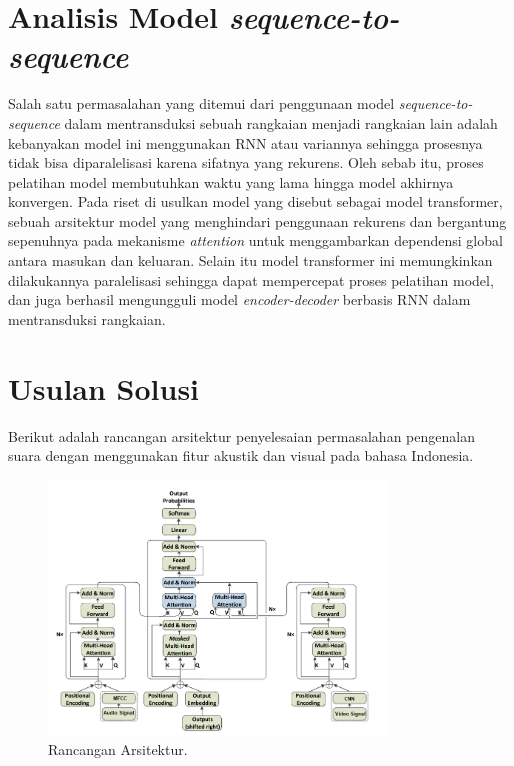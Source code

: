 \section{Analisis Model \textit{sequence-to-sequence}}

Salah satu permasalahan yang ditemui dari penggunaan model \textit{sequence-to-sequence} dalam mentransduksi sebuah rangkaian menjadi rangkaian lain adalah kebanyakan model ini menggunakan RNN atau variannya sehingga prosesnya tidak bisa diparalelisasi karena sifatnya yang rekurens. Oleh sebab itu, proses pelatihan model membutuhkan waktu yang lama hingga model akhirnya konvergen. Pada riset \textcite{Vaswani2017} di usulkan model yang disebut sebagai model transformer, sebuah arsitektur model yang menghindari penggunaan rekurens dan bergantung sepenuhnya pada mekanisme \textit{attention} untuk menggambarkan dependensi global antara masukan dan keluaran. Selain itu model transformer ini memungkinkan dilakukannya paralelisasi sehingga dapat mempercepat proses pelatihan model, dan juga berhasil mengungguli model \textit{encoder-decoder} berbasis RNN dalam mentransduksi rangkaian.

\section{Usulan Solusi}

Berikut adalah rancangan arsitektur penyelesaian permasalahan pengenalan suara dengan menggunakan fitur akustik dan visual pada bahasa Indonesia.

\begin{figure}[h]
    \centering
    \includegraphics[width=0.8\textwidth]{resources/images/usulan-arsitektur.png}
    \caption{Rancangan Arsitektur.}
    \label{fig:usulan-arsitektur}
\end{figure}

